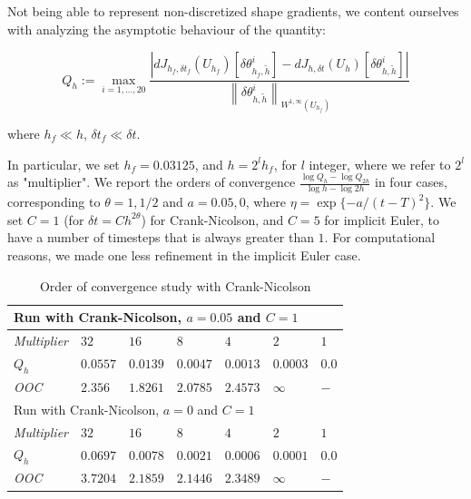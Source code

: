 \documentclass[english,a4paper,9pt,oneside]{scrbook}	%
\theoremstyle{break}
\theoremstyle{remark}
\newcommand{\ds}{\displaystyle}
\newcommand{\norm}[1]{\left\lVert#1\right\rVert}
\newcommand{\te}{\theta}
\begin{document}
Not being able to represent non-discretized shape gradients, we content ourselves with analyzing the asymptotic behaviour of the quantity:

$$Q_h:=\max_{i=1,...,20}\frac{|dJ_{h_f,\delta t_f}(U_{h_f})[\delta \te_{h_f,\tilde{h}}^i]-dJ_{h,\delta t}(U_h)[\delta \te_{h,\tilde{h}}^i]|}{\norm{\delta \te_{h,\tilde{h}}^i}_{W^{1,\infty}(U_{h_f})}}$$

where $h_f \ll h$, $\delta t_f \ll \delta t$.

In particular, we set $h_f = 0.03125$, and $h = 2^l h_f$, for $l$ integer, where we refer to $2^l$ as "multiplier". We report the orders of convergence $\ds \frac{\log Q_h-\log Q_{2h}}{\log h - \log 2h}$ in four cases, corresponding to $\theta =1, 1/2$ and $a = 0.05, 0$, where $\eta =\exp\{-a/(t-T)^2\} $. We set $C=1$ (for $\delta t = C h^{2\theta}$) for Crank-Nicolson, and $C=5$ for implicit Euler, to have a number of timesteps that is always greater than $1$. For computational reasons, we made one less refinement in the implicit Euler case.
%

\begin{table}[h]
\centering
\begin{tabular}{lllllll}
\hline
\multicolumn{7}{l}{Run with Crank-Nicolson, $a = 0.05$ and $C = 1$} \\ \hline
\textit{Multiplier} & $32$ & $16$ & $8$ & $4$ & $2$ & $1$\\ \hline
$Q_h$ & $0.0557$ & $0.0139$ & $0.0047$ & $0.0013$ & $0.0003$ & $0.0$\\ \hline
\textit{OOC} & $2.356$ & $1.8261$ & $2.0785$ & $2.4573$ & $\infty$ & $-$ \\ \hline
\hline
\multicolumn{7}{l}{Run with Crank-Nicolson, $a = 0$ and $C=1$} \\ \hline
\textit{Multiplier} & $32$ & $16$ & $8$ & $4$ & $2$ & $1$\\ \hline
$Q_h$ & $0.0697$ & $0.0078$ & $0.0021$ & $0.0006$ & $0.0001$ & $0.0$\\ \hline
\textit{OOC} & $3.7204$ & $2.1859$ & $2.1446$ & $2.3489$ & $\infty$ & $-$ \\ \hline
\end{tabular}
\caption{Order of convergence study with Crank-Nicolson}\label{tab:ooc_CN}
\end{table}
\end{document}
